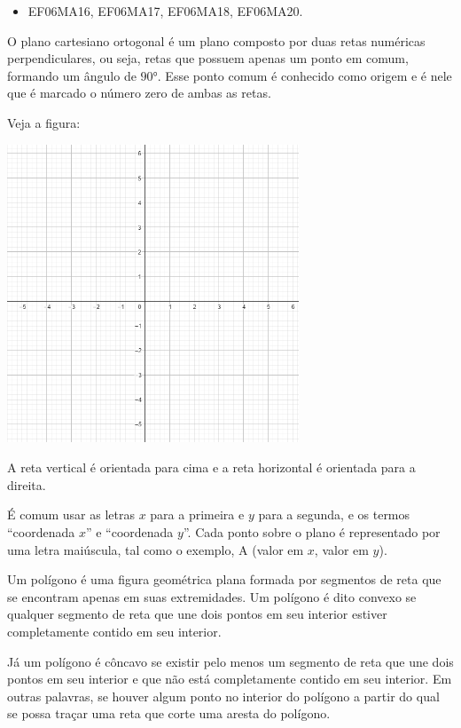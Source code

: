 
\begin{itemize} 
\item  EF06MA16, EF06MA17, EF06MA18, EF06MA20.
\end{itemize}

O plano cartesiano ortogonal é um plano composto por duas retas
numéricas perpendiculares, ou seja, retas que possuem apenas um ponto em
comum, formando um ângulo de $90$°. Esse ponto comum é conhecido como
origem e é nele que é marcado o número zero de ambas as retas.

Veja a figura:

\includegraphics[width=3.42575in,height=3.5in]{./imgSAEB_6_MAT/media/image39.png}

A reta vertical é orientada para cima e a reta horizontal é orientada
para a direita.

É comum usar as letras $x$ para a primeira e $y$ para a segunda, e os termos
``coordenada $x$'' e ``coordenada $y$''. Cada ponto sobre o plano é
representado por uma letra maiúscula, tal como o exemplo, A (valor em $x$, valor em $y$).

Um polígono é uma figura geométrica plana formada por segmentos de reta
que se encontram apenas em suas extremidades. Um polígono é dito convexo
se qualquer segmento de reta que une dois pontos em seu interior estiver
completamente contido em seu interior.

Já um polígono é côncavo se existir pelo menos um segmento de reta que
une dois pontos em seu interior e que não está completamente contido em
seu interior. Em outras palavras, se houver algum ponto no interior do
polígono a partir do qual se possa traçar uma reta que corte uma aresta
do polígono.

